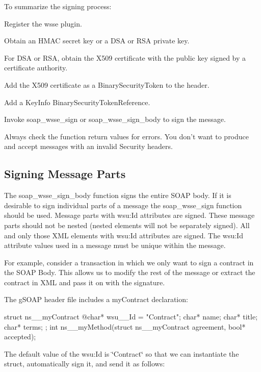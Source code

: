 To summarize the signing process:
\begin{DoxyEnumerate}
\item Register the wsse plugin.
\item Obtain an HMAC secret key or a DSA or RSA private key.
\item For DSA or RSA, obtain the X509 certificate with the public key signed by a certificate authority.
\item Add the X509 certificate as a BinarySecurityToken to the header.
\item Add a KeyInfo BinarySecurityTokenReference.
\item Invoke soap\_\-wsse\_\-sign or soap\_\-wsse\_\-sign\_\-body to sign the message.
\item Always check the function return values for errors. You don't want to produce and accept messages with an invalid Security headers.
\end{DoxyEnumerate}\hypertarget{wsse_wsse_8_2b}{}\subsection{Signing Message Parts}\label{wsse_wsse_8_2b}
The soap\_\-wsse\_\-sign\_\-body function signs the entire SOAP body. If it is desirable to sign individual parts of a message the soap\_\-wsse\_\-sign function should be used. Message parts with wsu:Id attributes are signed. These message parts should not be nested (nested elements will not be separately signed). All and only those XML elements with wsu:Id attributes are signed. The wsu:Id attribute values used in a message must be unique within the message.

For example, consider a transaction in which we only want to sign a contract in the SOAP Body. This allows us to modify the rest of the message or extract the contract in XML and pass it on with the signature.

The gSOAP header file includes a myContract declaration:


\begin{DoxyCode}
    struct ns__myContract
    { @char* wsu__Id = "Contract";
      char* name;
      char* title;
      char* terms;
    };
    int ns__myMethod(struct ns__myContract agreement, bool* accepted);
\end{DoxyCode}


The default value of the wsu:Id is \char`\"{}Contract\char`\"{} so that we can instantiate the struct, automatically sign it, and send it as follows:


